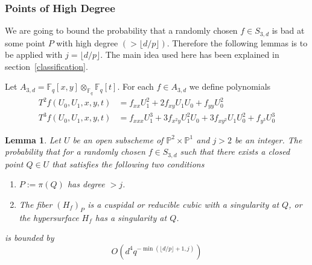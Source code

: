 \documentclass[12pt]{article}
\theoremstyle{plain}
\newtheorem{lemma}[equation]{Lemma}
\theoremstyle{definition}
\newcommand{\IF}{\mathbb{F}}
\newcommand{\IP}{\mathbb{P}}
\newcommand{\sB}{\mathcal{B}}
\newcommand\tensor{{\otimes}}
\newcommand\union{\bigcup}
\newcommand{\<}{\langle}
\renewcommand{\>}{\rangle}
\begin{document}
\subsubsection{Points of High Degree}
We are going to bound the probability that a randomly chosen $f \in S_{3, d}$ is bad at some point $P$ with high degree $(> \lfloor d/p \rfloor)$. Therefore the following lemmas is to be applied with $j = \lfloor d/p \rfloor$. The main idea used here has been explained in section~\ref{classification}.

Let $A_{3, d} = \IF_q[x, y]\tensor_{\IF_q} \IF_q[t]$. 
For each $f \in A_{3, d}$ we define polynomials
\begin{align*}
T^2 f(U_0, U_1, x, y, t) &= f_{xx}U_1^2 + 2f_{xy} U_1 U_0 + f_{yy} U_0^2 \\
T^3 f(U_0, U_1, x, y, t) &= f_{xxx} U_1^3 + 3 f_{x^2 y} U_1^2 U_0 + 3 f_{x y^2} U_1 U_0^2 + f_{y^3} U_0^3 
\end{align*}


\begin{lemma}
\label{elliptichigh}
Let $U$ be an open subscheme of $\IP^2 \times \IP^1$ and $j > 2$ be an integer. The probability that for a randomly chosen $f \in S_{3, d}$ such that there exists a closed point $Q \in U$ that satisfies the following two conditions
\begin{enumerate}
\item $P := \pi(Q)$ has degree $> j$. 
\item The fiber $(H_f)_P$ is a cuspidal or reducible cubic with a singularity at $Q$, or the hypersurface $H_f$ has a singularity at $Q$. 
\end{enumerate}
is bounded by 
$$ O(d^4 q^{-\min(\lfloor d/p \rfloor + 1, j)}) $$
\end{lemma}
\end{document}
